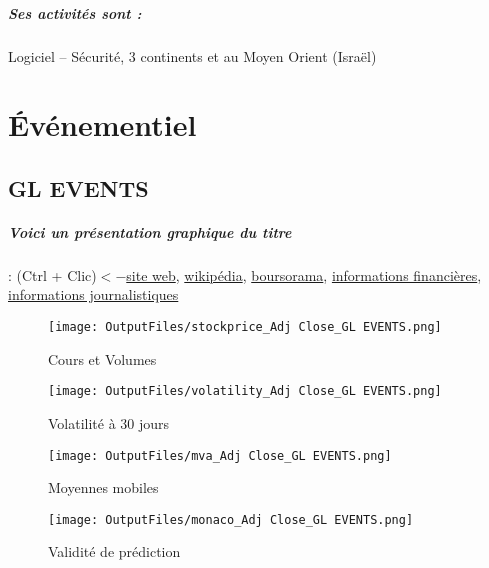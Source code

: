\documentclass[11pt,a4paper]{report}%
\begin{document}
\paragraph{Ses activités sont : } Logiciel – Sécurité, 3 continents et au Moyen Orient (Israël)  
    
    \newpage\chapter{Événementiel}


\section{GL EVENTS}

\paragraph{Voici un présentation graphique du titre} : (Ctrl + Clic)$<-$\href{https://www.gl-events.com/fr}{site web}, \href{https://fr.wikipedia.org/wiki/GL_Events}{wikipédia}, \href{https://www.boursorama.com/cours/1rPGLO}{boursorama}, \href{https://www.qwant.com/?q=site:https:%2f%2fwww.easybourse.com%2faction-societe%2fGL-EVENTS&t=web&client=ext-firefox-hp}{informations financières}, \href{https://bourse.lerevenu.com/cours-de-bourse/fiche-valeur-synthese/GL-EVENTS/GLO-FR}{informations journalistiques}
\begin{figure}[!htb]
   \begin{minipage}{0.5\textwidth}
     \centering
     \texttt{[image: OutputFiles/stockprice\_Adj Close\_GL EVENTS.png]}
     \caption{Cours et Volumes}\label{Fig:price_GL EVENTS}
   \end{minipage}\hfill
   \begin{minipage}{0.5\textwidth}
     \centering
     \texttt{[image: OutputFiles/volatility\_Adj Close\_GL EVENTS.png]}
     \caption{Volatilité à 30 jours}\label{Fig:volat_GL EVENTS}
   \end{minipage}
\end{figure}
\begin{figure}[!htb]
   \begin{minipage}{0.5\textwidth}
     \centering
     \texttt{[image: OutputFiles/mva\_Adj Close\_GL EVENTS.png]}
     \caption{Moyennes mobiles}\label{Fig:mva_GL EVENTS}
   \end{minipage}\hfill
   \begin{minipage}{0.5\textwidth}
     \centering
     \texttt{[image: OutputFiles/monaco\_Adj Close\_GL EVENTS.png]}
     \caption{Validité de prédiction}\label{Fig:prediction_GL EVENTS}
   \end{minipage}
\end{figure}
\end{document}
